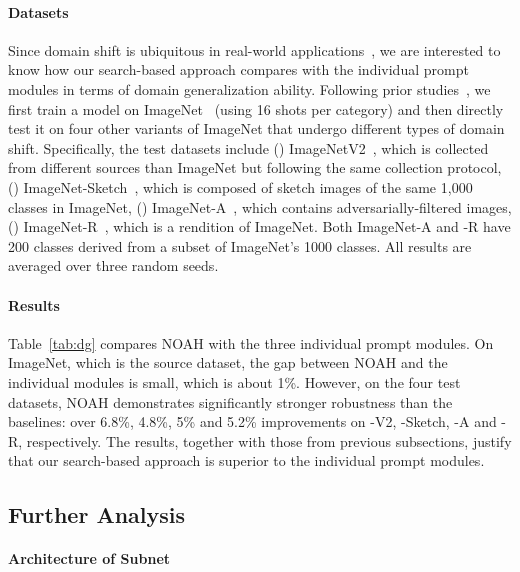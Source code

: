 \paragraph{Datasets}
Since domain shift is ubiquitous in real-world applications~\cite{zhou2021domain}, we are interested to know how our search-based approach compares with the individual prompt modules in terms of domain generalization ability. Following prior studies~\cite{zhou2021learning,zhou2022conditional}, we first train a model on ImageNet~\cite{deng2009imagenet} (using 16 shots per category) and then directly test it on four other variants of ImageNet that undergo different types of domain shift. Specifically, the test datasets include () ImageNetV2~\cite{recht2019imagenet}, which is collected from different sources than ImageNet but following the same collection protocol, () ImageNet-Sketch~\cite{wang2019learning}, which is composed of sketch images of the same 1,000 classes in ImageNet, () ImageNet-A~\cite{hendrycks2021natural}, which contains adversarially-filtered images, () ImageNet-R~\cite{hendrycks2021many}, which is a rendition of ImageNet. Both ImageNet-A and -R have 200 classes derived from a subset of ImageNet's 1000 classes. All results are averaged over three random seeds.

\paragraph{Results}
Table~\ref{tab:dg} compares NOAH with the three individual prompt modules. On ImageNet, which is the source dataset, the gap between NOAH and the individual modules is small, which is about 1\%. However, on the four test datasets, NOAH demonstrates significantly stronger robustness than the baselines: over 6.8\%, 4.8\%, 5\% and 5.2\% improvements on -V2, -Sketch, -A and -R, respectively. The results, together with those from previous subsections, justify that our search-based approach is superior to the individual prompt modules.

\subsection{Further Analysis}
\label{sec:exp;subsec:analysis}

\paragraph{Architecture of Subnet}

